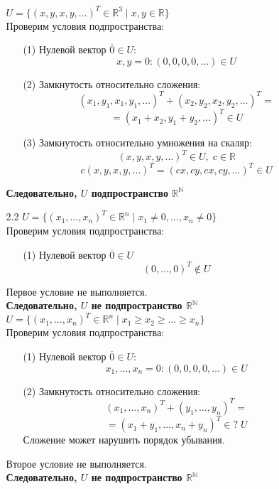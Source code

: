 \documentclass[a4paper]{article}
\newcommand{\RR}{\mathbb{R}}
\newcommand{\NN}{\mathbb{N}}
\begin{document}
\begin{enumerate}
\begin{enumerate}
        $U = \{(x, y, x, y, \dots)^T \in \RR^3 \mid x,y \in \RR\}$\\
        Проверим условия подпространства:
        \begin{enumerate}
            \item[(1)]Нулевой вектор $\overline{0} \in U$:
            $$x, y = 0: (0, 0, 0, 0, \dots) \in U$$
            \item[(2)]Замкнутость относительно сложения:
            $$(x_1, y_1, x_1, y_1, \dots)^T + (x_2, y_2, x_2, y_2, \dots)^T =$$
            $$= (x_1 + x_2, y_1 + y_2, \dots)^T \in U$$
            \item[(3)]Замкнутость относительно умножения на скаляр:
            $$(x, y, x, y, \dots)^T \in U, \; c \in \RR$$
            $$c(x, y, x, y, \dots)^T = (cx, cy, cx, cy, \dots)^T \in U$$
        \end{enumerate}
        \textbf{Следовательно, $U$ подпространство $\RR^\NN$}\\

        \item[2.2]$U = \{(x_1, \ldots, x_n)^T  \in \RR^n \mid x_1 \ne 0, \ldots, x_n \ne 0\}$\\
        Проверим условия подпространства:
        \begin{enumerate}
            \item[(1)]Нулевой вектор $\overline{0} \in U$
            $$(0, \ldots, 0)^T \notin U$$
        \end{enumerate}
        Первое условие не выполняется.\\
        \textbf{Следовательно, $U$ не подпространство $\RR^\NN$}\\
        
        $U = \{(x_1, \ldots, x_n)^T  \in \RR^n \mid x_1 \ge x_2 \ge \ldots \ge x_n\}$\\
        Проверим условия подпространства:
        \begin{enumerate}
            \item[(1)]Нулевой вектор $\overline{0} \in U$:
            $$x_1, \ldots, x_n = 0: (0, 0, 0, 0, \dots) \in U$$
            \item[(2)]Замкнутость относительно сложения:
            $$(x_1, \ldots, x_n)^T + (y_1, \ldots, y_n)^T =$$
            $$= (x_1+y_1, \ldots, x_n+y_n)^T \in? \; U$$
            Сложение может нарушить порядок убывания.
        \end{enumerate}
        Второе условие не выполняется.\\
        \textbf{Следовательно, $U$ не подпространство $\RR^\NN$}\\


\end{enumerate}
\end{enumerate}
\end{document}
